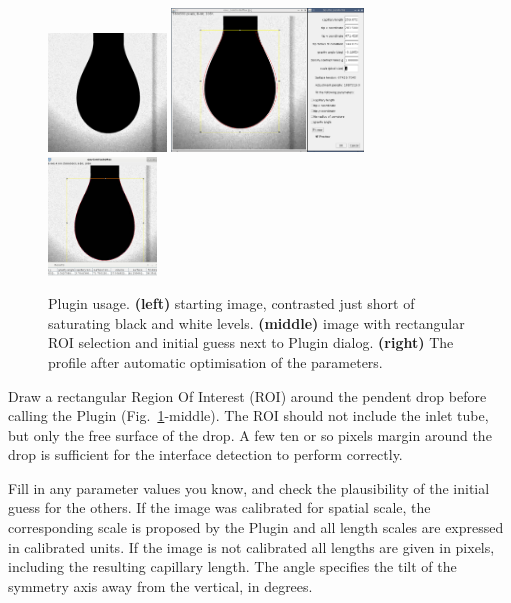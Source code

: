 \documentclass[fleqn]{scrartcl}
\begin{document}
\begin{figure}
  \centering
  \includegraphics[width=0.28\textwidth]{eauContrasteMax}\hfill
  \includegraphics[width=0.455\textwidth]{eauContrasteMaxInitial}\hfill
  \includegraphics[width=0.258\textwidth]{eauContrasteMaxFit}
  \caption{Plugin usage. \textbf{(left)} starting image, contrasted
    just short of saturating black and white levels. \textbf{(middle)}
    image with rectangular ROI selection and initial guess next to
    Plugin dialog. \textbf{(right)} The profile after automatic
    optimisation of the parameters.}
  \label{fig:usage}
\end{figure}

Draw a rectangular Region Of Interest (ROI) around the pendent drop
before calling the Plugin (Fig.~\ref{fig:usage}-middle). The ROI
should not include the inlet tube, but only the free surface of the
drop. A few ten or so pixels margin around the drop is sufficient for
the interface detection to perform correctly.

Fill in any parameter values you know, and check the plausibility of
the initial guess for the others. If the image was calibrated for
spatial scale, the corresponding scale is proposed by the Plugin and
all length scales are expressed in calibrated units. If the image is
not calibrated all lengths are given in pixels, including the
resulting capillary length. The angle specifies the tilt of the
symmetry axis away from the vertical, in degrees. 
\end{document}
